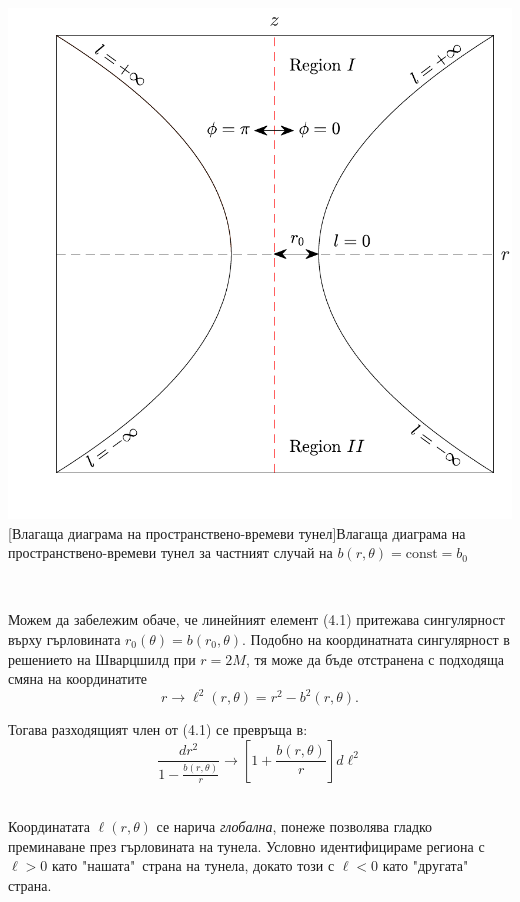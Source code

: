 \noindent\begin{minipage}{15em}
	\centering
	\hspace{-0.99cm}
	\includegraphics[scale = 0.4]{WH_embedding.pdf}
	[Влагаща диаграма на пространствено-времеви тунел]{\small Влагаща диаграма на пространствено-времеви тунел за частният случай на $b(r,\theta) = \text{const} = b_0$}
	\label{WH_embedding}
\end{minipage}\,\,
\begin{minipage}{20em}
	Можем да забележим обаче, че линейният елемент (4.1) притежава сингулярност върху гърловината $r_0(\theta) = b(r_0,\theta)$. Подобно на координатната сингулярност в решението на Шварцшилд при $r = 2M$, тя може да бъде отстранена с подходяща смяна на координатите 
	\begin{equation}
	r	 \rightarrow \ell^2(r,\theta) = r^2 - b^2(r,\theta).
	\end{equation}
	
	Тогава разходящият член от (4.1) се превръща в:
	\begin{equation}
		\frac{dr^2}{1 - \frac{b(r,\theta)}{r}} \rightarrow \left[1 + \frac{b(r,\theta)}{r}\right]d\ell^2
	\end{equation}
	
\end{minipage}\\\newline
Координатата $\ell(r,\theta)$ се нарича \emph{глобална}, понеже позволява гладко преминаване през гърловината на тунела. Условно идентифицираме региона с $\ell >0$ като "нашата"$\,$ страна на тунела, докато този с $\ell < 0$ като "другата"$\,$ страна.\\

